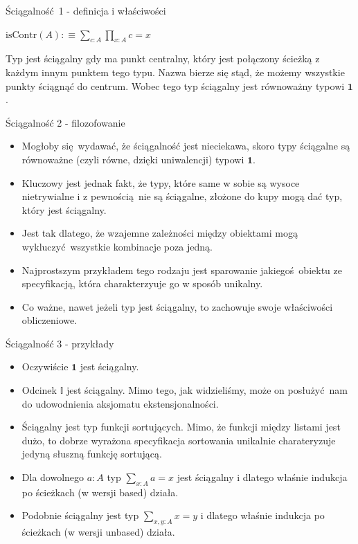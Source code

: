 \documentclass{beamer}
\newcommand{\defn}{:\equiv}
\newcommand{\isContr}{\text{isContr}}
\newcommand{\I}{\mathbb{I}}
\begin{document}
\begin{frame}{Ściągalność 1 - definicja i właściwości}

\begin{definition}[Ściągalność]
$
\displaystyle
\isContr(A) \defn \sum_{c : A} \prod_{x : A} c = x
$
\end{definition}

Typ jest ściągalny gdy ma punkt centralny, który jest połączony ścieżką z każdym innym punktem tego typu. Nazwa bierze się stąd, że możemy wszystkie punkty ściągnąć do centrum. Wobec tego typ ściągalny jest równoważny typowi $\mathbf{1}$.

\end{frame}

\begin{frame}{Ściągalność 2 - filozofowanie}
\begin{itemize}
	\item Mogłoby się wydawać, że ściągalność jest nieciekawa, skoro typy ściągalne są równoważne (czyli równe, dzięki uniwalencji) typowi $\mathbf{1}$.
	\item Kluczowy jest jednak fakt, że typy, które same w sobie są wysoce nietrywialne i z pewnością nie są ściągalne, złożone do kupy mogą dać typ, który jest ściągalny.
	\item Jest tak dlatego, że wzajemne zależności między obiektami mogą wykluczyć wszystkie kombinacje poza jedną.
	\item Najprostszym przykładem tego rodzaju jest sparowanie jakiegoś obiektu ze specyfikacją, która charakterzyuje go w sposób unikalny.
	\item Co ważne, nawet jeżeli typ jest ściągalny, to zachowuje swoje właściwości obliczeniowe.
\end{itemize}
\end{frame}

\begin{frame}{Ściągalność 3 - przykłady}
\begin{itemize}
	\item Oczywiście $\mathbf{1}$ jest ściągalny.
	\item Odcinek $\I$ jest ściągalny. Mimo tego, jak widzieliśmy, może on posłużyć nam do udowodnienia aksjomatu ekstensjonalności.
	\item Ściągalny jest typ funkcji sortujących. Mimo, że funkcji między listami jest dużo, to dobrze wyrażona specyfikacja sortowania unikalnie charateryzuje jedyną słuszną funkcję sortującą.
	\item Dla dowolnego $a : A$ typ $\sum_{x : A} a = x$ jest ściągalny i dlatego właśnie indukcja po ścieżkach (w wersji based) działa.
	\item Podobnie ściągalny jest typ $\sum_{x,y : A} x = y$ i dlatego właśnie indukcja po ścieżkach (w wersji unbased) działa.
\end{itemize}
\end{frame}
\end{document}
